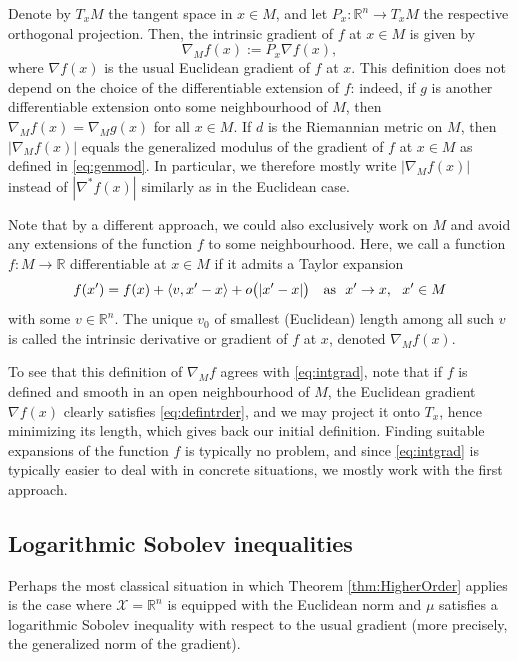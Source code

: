 \documentclass[a4paper,12pt]{amsart}
\numberwithin{equation}{section}
\theoremstyle{remark}
\def\R{{\mathbb R}}
\begin{document}
Denote by $T_xM$ the tangent space in $x \in M$, and let $P_x \colon \R^n \to T_xM$ the respective orthogonal projection. Then, the intrinsic gradient of $f$ at $x \in M$ is given by
\begin{equation}\label{eq:intgrad}
	\nabla_M f(x) := P_x \nabla f(x),
\end{equation}
where $\nabla f(x)$ is the usual Euclidean gradient of $f$ at $x$. This definition does not depend on the choice of the differentiable extension of $f$: indeed, if $g$ is another differentiable extension onto some neighbourhood of $M$, then $\nabla_M f(x) = \nabla_M g(x)$ for all $x \in M$. If $d$ is the Riemannian metric on $M$, then $\lvert \nabla_M f(x) \rvert$ equals the generalized modulus of the gradient of $f$ at $x \in M$ as defined in \eqref{eq:genmod}. In particular, we therefore mostly write $|\nabla_M f(x)|$ instead of $|\nabla^\ast f(x)|$ similarly as in the Euclidean case.

Note that by a different approach, we could also exclusively work on $M$ and avoid any extensions of the function $f$ to some neighbourhood. Here, we call a function $f \colon M \to \mathbb{R}$ differentiable at $x \in M$ if it admits a Taylor expansion
\begin{equation}\label{eq:defintrder}
	f(x') = f(x) + \langle v,x' - x\rangle + o\big(|x' - x|\big) \quad {\rm as} \ \ x' \rightarrow x, \ \ x' \in M
\end{equation}
with some $v \in \R^n$. The unique $v_0$ of smallest (Euclidean) length among all such $v$ is called the intrinsic derivative or gradient of $f$ at $x$, denoted $\nabla_M f(x)$.

To see that this definition of $\nabla_M f$ agrees with \eqref{eq:intgrad}, note that if $f$ is defined and smooth in an open neighbourhood of $M$, the Euclidean gradient $\nabla f(x)$ clearly satisfies \eqref{eq:defintrder}, and we may project it onto $T_x$, hence minimizing its length, which gives back our initial definition. Finding suitable expansions of the function $f$ is typically no problem, and since \eqref{eq:intgrad} is typically easier to deal with in concrete situations, we mostly work with the first approach.

\subsection{Logarithmic Sobolev inequalities}\label{sec:LSIs}

Perhaps the most classical situation in which Theorem \ref{thm:HigherOrder} applies is the case where $\mathcal{X} = \R^n$ is equipped with the Euclidean norm and $\mu$ satisfies a logarithmic Sobolev inequality with respect to the usual gradient (more precisely, the generalized norm of the gradient).
\end{document}
